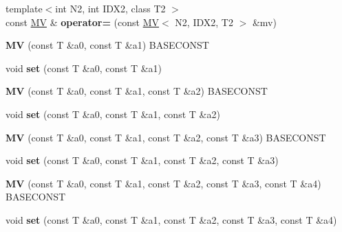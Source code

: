 \begin{DoxyCompactItemize}
\item 
\hypertarget{classvsr_1_1_m_v_ae5278117779c38042ec2352076a39363}{{\footnotesize template$<$int N2, int I\-D\-X2, class T2 $>$ }\\const \hyperlink{classvsr_1_1_m_v}{M\-V} \& {\bfseries operator=} (const \hyperlink{classvsr_1_1_m_v}{M\-V}$<$ N2, I\-D\-X2, T2 $>$ \&mv)}\label{classvsr_1_1_m_v_ae5278117779c38042ec2352076a39363}

\item 
\hypertarget{classvsr_1_1_m_v_a17cc517c6736d19b146f68f2063f9939}{{\bfseries M\-V} (const T \&a0, const T \&a1) B\-A\-S\-E\-C\-O\-N\-S\-T}\label{classvsr_1_1_m_v_a17cc517c6736d19b146f68f2063f9939}

\item 
\hypertarget{classvsr_1_1_m_v_a2207a3739198b12ff150e1ea0a527c3a}{void {\bfseries set} (const T \&a0, const T \&a1)}\label{classvsr_1_1_m_v_a2207a3739198b12ff150e1ea0a527c3a}

\item 
\hypertarget{classvsr_1_1_m_v_ae16a59e2c349c36c9d75efdf664768e6}{{\bfseries M\-V} (const T \&a0, const T \&a1, const T \&a2) B\-A\-S\-E\-C\-O\-N\-S\-T}\label{classvsr_1_1_m_v_ae16a59e2c349c36c9d75efdf664768e6}

\item 
\hypertarget{classvsr_1_1_m_v_a2266045f09281c63fab5c2103e7a010b}{void {\bfseries set} (const T \&a0, const T \&a1, const T \&a2)}\label{classvsr_1_1_m_v_a2266045f09281c63fab5c2103e7a010b}

\item 
\hypertarget{classvsr_1_1_m_v_a0f668c0de5a7b2e7f07fee679668a744}{{\bfseries M\-V} (const T \&a0, const T \&a1, const T \&a2, const T \&a3) B\-A\-S\-E\-C\-O\-N\-S\-T}\label{classvsr_1_1_m_v_a0f668c0de5a7b2e7f07fee679668a744}

\item 
\hypertarget{classvsr_1_1_m_v_a70ba01726b2caa3a0620d58923006816}{void {\bfseries set} (const T \&a0, const T \&a1, const T \&a2, const T \&a3)}\label{classvsr_1_1_m_v_a70ba01726b2caa3a0620d58923006816}

\item 
\hypertarget{classvsr_1_1_m_v_afc42fd52db3cbc95975a7aeeb551005c}{{\bfseries M\-V} (const T \&a0, const T \&a1, const T \&a2, const T \&a3, const T \&a4) B\-A\-S\-E\-C\-O\-N\-S\-T}\label{classvsr_1_1_m_v_afc42fd52db3cbc95975a7aeeb551005c}

\item 
\hypertarget{classvsr_1_1_m_v_ab6596047bd2e25b0c966fa9d84339814}{void {\bfseries set} (const T \&a0, const T \&a1, const T \&a2, const T \&a3, const T \&a4)}\label{classvsr_1_1_m_v_ab6596047bd2e25b0c966fa9d84339814}


\end{DoxyCompactItemize}
